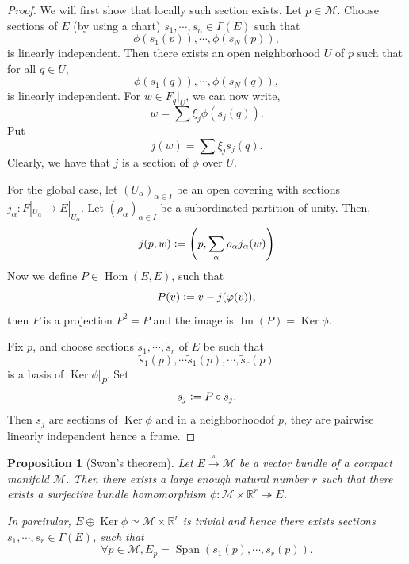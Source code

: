 \documentclass[10pt]{article}
\newtheorem{proposition}{Proposition}[section]
\DeclareMathOperator{\Hom}{Hom}
\DeclareMathOperator{\Ker}{Ker}
\DeclareMathOperator{\Image}{Im}
\DeclareMathOperator{\Span}{Span}
\newcommand{\defeq}{\vcentcolon=}
\newcommand{\R}[0]{\mathbb{R}}
\newcommand{\M}[0]{\mathcal{M}}
\begin{document}
\begin{proof}
  We will first show that locally such section exists. Let $p\in\M$. Choose sections of $E$ (by using a chart) $s_1,\cdots,s_n\in\Gamma(E)$ such that 
  \begin{equation*}
    \phi(s_1(p)),\cdots,\phi(s_N(p)),
  \end{equation*}
  is linearly independent. Then there exists an open neighborhood $U$ of $p$ such that for all $q\in U$,
  \begin{equation*}
    \phi(s_1(q)),\cdots,\phi(s_N(q)),
  \end{equation*}
  is linearly independent. For $w\in F_q|_U$, we can now write,
  \begin{equation*}
    w = \sum\xi_j\phi(s_j(q)).
  \end{equation*}
  Put 
  \begin{equation*}
    j(w) = \sum\xi_js_j(q).
  \end{equation*}
  Clearly, we have that $j$ is a section of $\phi$ over $U$.
  \par For the global case, let $(U_\alpha)_{\alpha\in I}$ be an open covering with sections $j_\alpha:F|_{U_\alpha}\to E|_{U_\alpha}$. Let $(\rho_\alpha)_{\alpha\in I}$ be a subordinated partition of unity. Then,
  \begin{equation*}
    j(p,w) \defeq \left(p,\sum_{\alpha} \rho_{\alpha}j_{\alpha}(w)\right)
  \end{equation*}
  Now we define $P\in\Hom(E,E)$, such that
  \begin{equation*}
    P(v) \defeq v-j(\varphi(v)),
  \end{equation*}
  then $P$ is a projection $P^2=P$ and the image is $\Image(P) = \Ker \phi$.
  \par Fix $p$, and choose sections $\tilde{s}_1,\cdots,\tilde{s}_r$ of $E$ be such that 
  \begin{equation*}
    \tilde{s}_1(p),\cdots\tilde{s}_1(p),\cdots,\tilde{s}_r(p)
  \end{equation*}
  is a basis of $\Ker\phi|_P$. Set 
  \begin{equation*}
    s_j\defeq P\circ\tilde{s}_j.
  \end{equation*}
  Then $s_j$ are sections of $\Ker\phi$ and in a neighborhoodof $p$, they are pairwise linearly independent hence a frame.
\end{proof}

\begin{proposition}[Swan's theorem]
  \label{proposition_9_10}
  Let $E\stackrel{\pi}{\to}\M$ be a vector bundle of a compact manifold $\M$. Then there exists a large enough natural number $r$ such that there exists a surjective bundle homomorphism $\phi:\M\times\R^r\twoheadrightarrow E$.
  \par In parcitular, $E\oplus\Ker\phi\simeq \M\times \R^r$ is trivial and hence there exists sections $s_1,\cdots,s_r\in\Gamma(E)$, such that 
  \begin{equation*}
    \forall p\in\M, E_p = \Span(s_1(p),\cdots,s_r(p)).
  \end{equation*}
\end{proposition}
\end{document}
